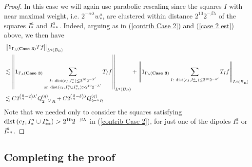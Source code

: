 \documentclass{amsart}%
\theoremstyle{plain}
\numberwithin{equation}{section}
\begin{document}
\begin{proof}
In this case we will again use parabolic rescaling since the squares $I$ with
near maximal weight, i.e. $2^{-\alpha\lambda}w_{\ast}^{a}$, are clustered
within distance $2^{10}2^{-\beta\lambda}$ of the squares $I_{\ast}^{a}$ and
$I_{\ast\ast}^{a}$. Indeed, arguing as in (\ref{contrib Case 2}) and
(\ref{case 2 est}) above, we then have%
\begin{align*}
&  \left\Vert \mathbf{1}_{\Gamma_{\lambda}\left(  \text{\textbf{Case 3}%
}\right)  }Tf\right\Vert _{L^{q}\left(  B_{R}\right)  }\\
&  \lesssim\left\Vert \mathbf{1}_{\Gamma_{\lambda}\left(  \text{\textbf{Case
3}}\right)  }\sum_{\substack{I:\ \mathop{\rm dist}\left(  c_{I},I_{\ast}%
^{a}\right)  \leq2^{10}2^{-\lambda^{\prime}} \\\text{or }%
\mathop{\rm dist}\left(  c_{I},I_{\ast}^{a}\cup I_{\ast\ast}^{a}\right)
>2^{10}2^{-\lambda^{\prime}}}}T_{I}f\right\Vert _{L^{q}\left(  B_{R}\right)
}+\left\Vert \mathbf{1}_{\Gamma_{\lambda}\left(  \text{\textbf{Case 3}%
}\right)  }\sum_{I:\ \mathop{\rm dist}\left(  c_{I},I_{\ast\ast}^{a}\right)
\leq2^{10}2^{-\lambda^{\prime}}}T_{I}f\right\Vert _{L^{q}\left(  B_{R}\right)
}\\
&  \lesssim C2^{\left(  \frac{6}{q}-2\right)  \lambda^{\prime}}Q_{2^{-\lambda
^{\prime}}R}^{\left(  q\right)  }+C2^{\left(  \frac{3}{q}-\delta\right)
\lambda}Q_{2^{-\lambda}R}^{\left(  q\right)  }\ .
\end{align*}
Note that we needed only to consider the squares satisfying $\mathop{\rm
dist}\left(  c_{I},I_{\ast}^{a}\cup I_{\ast\ast}^{a}\right)  >2^{10}%
2^{-\beta\lambda}$ in (\ref{contrib Case 2}), for just one of the dipoles
$I_{\ast}^{a}$ or $I_{\ast\ast}^{a}$.
\end{proof}

\subsection{Completing the proof}
\end{document}
